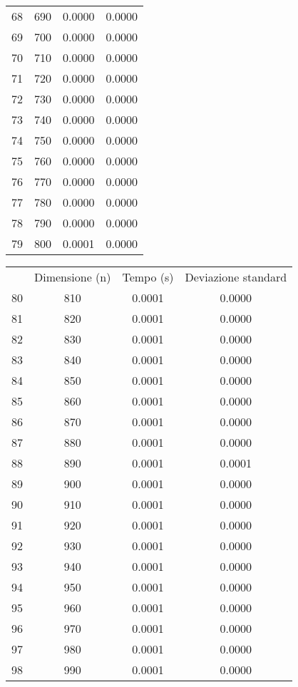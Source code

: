 \begin{table}
\begin{adjustbox}{width=1\textwidth/2}
\begin{tabular}{|c|c|c|c|}
68 & 690 & 0.0000 & 0.0000 \\
\cline{1-4}
69 & 700 & 0.0000 & 0.0000 \\
\cline{1-4}
70 & 710 & 0.0000 & 0.0000 \\
\cline{1-4}
71 & 720 & 0.0000 & 0.0000 \\
\cline{1-4}
72 & 730 & 0.0000 & 0.0000 \\
\cline{1-4}
73 & 740 & 0.0000 & 0.0000 \\
\cline{1-4}
74 & 750 & 0.0000 & 0.0000 \\
\cline{1-4}
75 & 760 & 0.0000 & 0.0000 \\
\cline{1-4}
76 & 770 & 0.0000 & 0.0000 \\
\cline{1-4}
77 & 780 & 0.0000 & 0.0000 \\
\cline{1-4}
78 & 790 & 0.0000 & 0.0000 \\
\cline{1-4}
79 & 800 & 0.0001 & 0.0000 \\
\cline{1-4}
\end{tabular}
\end{adjustbox}
\end{table}

\begin{table}
\centering
\begin{adjustbox}{width=1\textwidth/2}
\begin{tabular}{|c|c|c|c|}
\hline
 & Dimensione (n) & Tempo (s) & Deviazione standard \\
80 & 810 & 0.0001 & 0.0000 \\
\cline{1-4}
81 & 820 & 0.0001 & 0.0000 \\
\cline{1-4}
82 & 830 & 0.0001 & 0.0000 \\
\cline{1-4}
83 & 840 & 0.0001 & 0.0000 \\
\cline{1-4}
84 & 850 & 0.0001 & 0.0000 \\
\cline{1-4}
85 & 860 & 0.0001 & 0.0000 \\
\cline{1-4}
86 & 870 & 0.0001 & 0.0000 \\
\cline{1-4}
87 & 880 & 0.0001 & 0.0000 \\
\cline{1-4}
88 & 890 & 0.0001 & 0.0001 \\
\cline{1-4}
89 & 900 & 0.0001 & 0.0000 \\
\cline{1-4}
90 & 910 & 0.0001 & 0.0000 \\
\cline{1-4}
91 & 920 & 0.0001 & 0.0000 \\
\cline{1-4}
92 & 930 & 0.0001 & 0.0000 \\
\cline{1-4}
93 & 940 & 0.0001 & 0.0000 \\
\cline{1-4}
94 & 950 & 0.0001 & 0.0000 \\
\cline{1-4}
95 & 960 & 0.0001 & 0.0000 \\
\cline{1-4}
96 & 970 & 0.0001 & 0.0000 \\
\cline{1-4}
97 & 980 & 0.0001 & 0.0000 \\
\cline{1-4}
98 & 990 & 0.0001 & 0.0000 \\
\cline{1-4}
\end{tabular}
\end{adjustbox}
\end{table}

